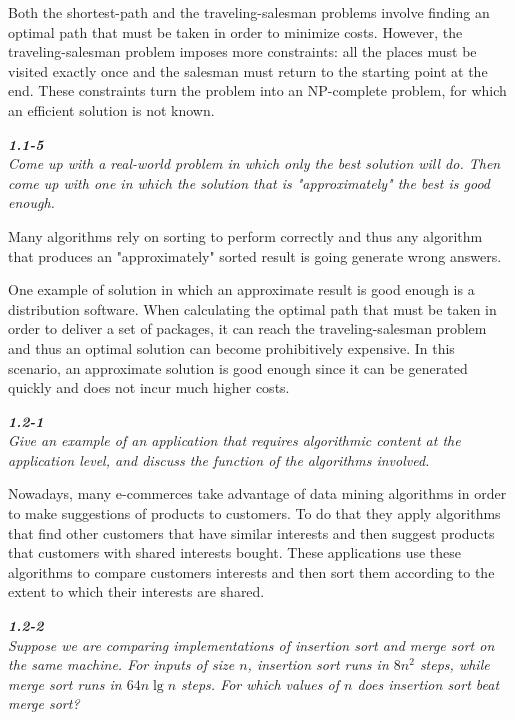 \documentclass[8pt,a4paper]{article}
\begin{document}
Both the shortest-path and the traveling-salesman problems involve finding
an optimal path that must be taken in order to minimize costs. However, the
traveling-salesman problem imposes more constraints: all the places must be
visited exactly once and the salesman must return to the starting point at
the end. These constraints turn the problem into an NP-complete problem, for
which an efficient solution is not known.

\begin{framed}
\textbf{\textit{1.1-5}} \\
\textit{Come up with a real-world problem in which only the best solution will
do. Then come up with one in which the solution that is "approximately" the best
is good enough.}
\end{framed}

Many algorithms rely on sorting to perform correctly and thus any algorithm
that produces an "approximately" sorted result is going generate wrong answers.

One example of solution in which an approximate result is good enough is a
distribution software. When calculating the optimal path that must be taken
in order to deliver a set of packages, it can reach the traveling-salesman
problem and thus an optimal solution can become prohibitively expensive.
In this scenario, an approximate solution is good enough since it can be
generated quickly and does not incur much higher costs.

\begin{framed}
\textbf{\textit{1.2-1}} \\
\textit{Give an example of an application that requires algorithmic content at the
application level, and discuss the function of the algorithms involved.}
\end{framed}

Nowadays, many e-commerces take advantage of data mining algorithms in order to
make suggestions of products to customers. To do that they apply algorithms
that find other customers that have similar interests and then suggest products
that customers with shared interests bought. These applications use these
algorithms to compare customers interests and then sort them according to the
extent to which their interests are shared.

\begin{framed}
\textbf{\textit{1.2-2}} \\
\textit{Suppose we are comparing implementations of insertion sort and merge sort
on the same machine. For inputs of size $n$, insertion sort runs in $8n^{2}$ steps,
while merge sort runs in $64n \lg n$ steps. For which values of $n$ does insertion
sort beat merge sort?}
\end{framed}
\end{document}
